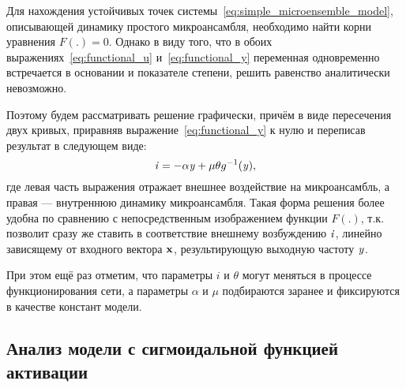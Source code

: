 Для нахождения устойчивых точек системы~\eqref{eq:simple_microensemble_model}, описывающей динамику простого микроансамбля, необходимо найти корни уравнения $F(.) = 0$. Однако в виду того, что в обоих выражениях~\eqref{eq:functional_u} и~\eqref{eq:functional_y} переменная одновременно встречается в основании и показателе степени, решить равенство аналитически невозможно. 

Поэтому будем рассматривать решение графически, причём в виде пересечения двух кривых, приравняв выражение~\eqref{eq:functional_y} к нулю и переписав результат в следующем виде:
\begin{equation}
    \label{eq:graphic_solution}
    \mathit{i} = - \alpha \mathit{y} + \mu \theta g^{-1}(\mathit{y}),
\end{equation}
где левая часть выражения отражает внешнее воздействие на микроансамбль, а правая --- внутреннюю динамику микроансамбля. Такая форма решения более удобна по сравнению с непосредственным изображением функции $F(.)$, т.к. позволит сразу же ставить в соответствие внешнему возбуждению $\mathit{i}$, линейно зависящему от входного вектора $\mathrm{\mathbf{x}}$, результирующую выходную частоту $\mathit{y}$.

При этом ещё раз отметим, что параметры $i$ и $\theta$ могут меняться в процессе функционирования сети, а параметры $\alpha$ и $\mu$ подбираются заранее и фиксируются в качестве констант модели.

\subsection{Анализ модели с сигмоидальной функцией активации}

